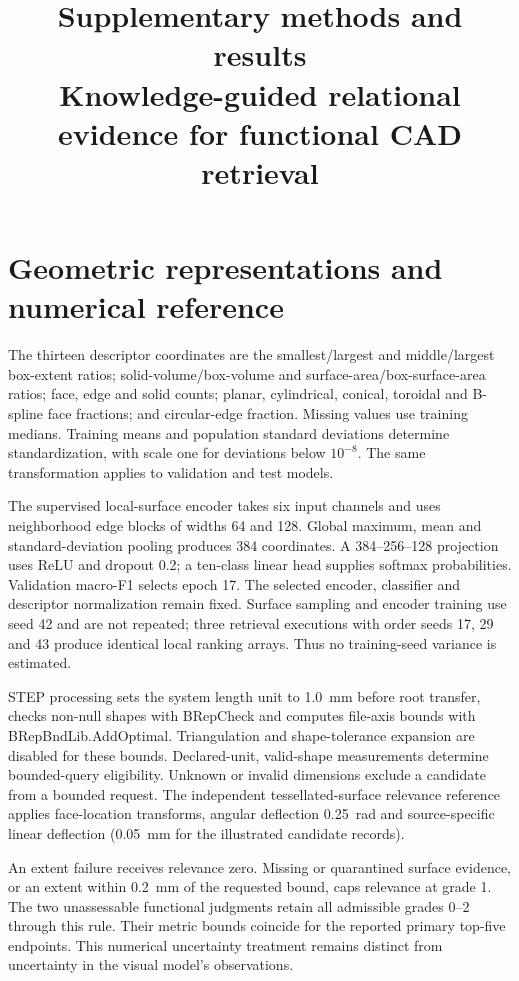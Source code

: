\documentclass[10pt,a4paper]{article}
\title{Supplementary methods and results\\Knowledge-guided relational evidence for functional CAD retrieval}
\author{}\date{}
\begin{document}
\maketitle

\section{Geometric representations and numerical reference}

The thirteen descriptor coordinates are the smallest/largest and middle/largest
box-extent ratios; solid-volume/box-volume and surface-area/box-surface-area
ratios; face, edge and solid counts; planar, cylindrical, conical, toroidal and
B-spline face fractions; and circular-edge fraction. Missing values use training
medians. Training means and population standard deviations determine
standardization, with scale one for deviations below $10^{-8}$. The same
transformation applies to validation and test models.

The supervised local-surface encoder takes six input channels and uses
neighborhood edge blocks of widths 64 and 128. Global maximum, mean and
standard-deviation pooling produces 384 coordinates. A 384--256--128 projection
uses ReLU and dropout 0.2; a ten-class linear head supplies softmax probabilities.
Validation macro-F1 selects epoch 17. The selected encoder, classifier and
descriptor normalization remain fixed. Surface sampling and encoder training use
seed 42 and are not repeated; three retrieval executions with order seeds 17, 29
and 43 produce identical local ranking arrays. Thus no training-seed variance is
estimated.

STEP processing sets the system length unit to 1.0~mm before root transfer,
checks non-null shapes with BRepCheck and computes file-axis bounds with
BRepBndLib.AddOptimal. Triangulation and shape-tolerance expansion are disabled
for these bounds. Declared-unit, valid-shape measurements determine bounded-query
eligibility. Unknown or invalid dimensions exclude a candidate from a bounded
request. The independent tessellated-surface relevance reference applies
face-location transforms, angular deflection 0.25~rad and source-specific linear
deflection (0.05~mm for the illustrated candidate records).

An extent failure receives relevance zero. Missing or quarantined surface
evidence, or an extent within 0.2~mm of the requested bound, caps relevance at
grade 1. The two unassessable functional judgments retain all admissible grades
0--2 through this rule. Their metric bounds coincide for the reported primary
top-five endpoints. This numerical uncertainty treatment remains distinct from
uncertainty in the visual model's observations.
\end{document}
